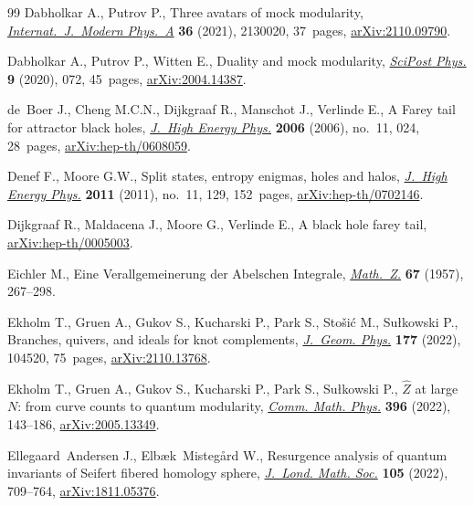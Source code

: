 \documentclass[pdftex]{sigma}
\theoremstyle{definition}
\numberwithin{equation}{section}
\begin{document}
\begin{thebibliography}{99}
Dabholkar A., Putrov P., Three avatars of mock modularity,
 \href{https://doi.org/10.1142/S0217751X21300209}{\textit{Internat.~J.~Modern Phys.~A}} \textbf{36} (2021), 2130020, 37~pages,
 \href{https://arxiv.org/abs/2110.09790}{arXiv:2110.09790}.

Dabholkar A., Putrov P., Witten E., Duality and mock modularity,
 \href{https://doi.org/10.21468/scipostphys.9.5.072}{\textit{SciPost Phys.}} \textbf{9} (2020), 072, 45~pages, \href{https://arxiv.org/abs/2004.14387}{arXiv:2004.14387}.

de~Boer J., Cheng M.C.N., Dijkgraaf R., Manschot J., Verlinde E., A {F}arey
 tail for attractor black holes, \href{https://doi.org/10.1088/1126-6708/2006/11/024}{\textit{J.~High Energy Phys.}} \textbf{2006}
 (2006), no.~11, 024, 28~pages, \href{https://arxiv.org/abs/hep-th/0608059}{arXiv:hep-th/0608059}.

Denef F., Moore G.W., Split states, entropy enigmas, holes and halos,
 \href{https://doi.org/10.1007/JHEP11(2011)129}{\textit{J.~High Energy Phys.}} \textbf{2011} (2011), no.~11, 129, 152~pages,
 \href{https://arxiv.org/abs/hep-th/0702146}{arXiv:hep-th/0702146}.

Dijkgraaf R., Maldacena J., Moore G., Verlinde E., A black hole farey tail,
 \href{https://arxiv.org/abs/hep-th/0005003}{arXiv:hep-th/0005003}.

Eichler M., Eine {V}erallgemeinerung der {A}belschen {I}ntegrale,
 \href{https://doi.org/10.1007/BF01258863}{\textit{Math.~Z.}} \textbf{67} (1957), 267--298.

Ekholm T., Gruen A., Gukov S., Kucharski P., Park S., Sto\v{s}i\'c M.,
 Su{\l}kowski P., Branches, quivers, and ideals for knot complements,
 \href{https://doi.org/10.1016/j.geomphys.2022.104520}{\textit{J.~Geom. Phys.}} \textbf{177} (2022), 104520, 75~pages,
 \href{https://arxiv.org/abs/2110.13768}{arXiv:2110.13768}.

Ekholm T., Gruen A., Gukov S., Kucharski P., Park S., Su{\l}kowski P.,
 {$\hat{Z}$} at large {$N$}: from curve counts to quantum modularity,
 \href{https://doi.org/10.1007/s00220-022-04469-9}{\textit{Comm. Math. Phys.}} \textbf{396} (2022), 143--186,
 \href{https://arxiv.org/abs/2005.13349}{arXiv:2005.13349}.

Ellegaard~Andersen J., Elb{\ae}k~Misteg{\r{a}}rd W., Resurgence analysis of
 quantum invariants of {S}eifert fibered homology sphere, \href{https://doi.org/10.1112/jlms.12506}{\textit{J.~Lond.
 Math. Soc.}} \textbf{105} (2022), 709--764, \href{https://arxiv.org/abs/1811.05376}{arXiv:1811.05376}.


\end{thebibliography}
\end{document}
